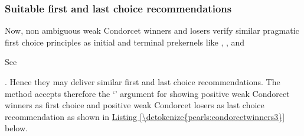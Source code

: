 \documentclass[a4paper,12pt,english]{sphinxhowto}
\begin{document}
\subsubsection{Suitable first and last choice recommendations}
\label{\detokenize{pearls:suitable-first-and-last-choice-recommendations}}
\sphinxAtStartPar
Now, non ambiguous weak Condorcet winners and losers verify similar pragmatic first choice principles as initial and terminal prekernels like , ,  and  %
\begin{footnote}[31]\sphinxAtStartFootnote
See 
%
\end{footnote}. Hence they may deliver similar first and last choice recommendations. The  method accepts therefore the ‘’  argument for showing positive weak Condorcet winners as first choice and positive weak Condorcet losers as last choice recommendation as shown in \hyperref[\detokenize{pearls:condorcetwinners3}]{Listing \ref{\detokenize{pearls:condorcetwinners3}}} below.
\def\sphinxLiteralBlockLabel{\label{\detokenize{pearls:condorcetwinners3}}}
%
\end{document}
